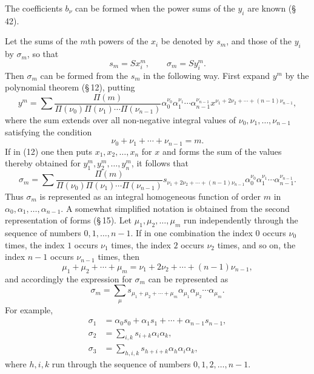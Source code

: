 \documentclass[11pt]{article}
\begin{document}
The coefficients $b_\nu$ can be formed when the power sums of the $y_i$ are known (\S\,42).

Let the sums of the $m$th powers of the $x_i$ be denoted by $s_m$, and those of the $y_i$ by $\sigma_m$, so that
\[
s_m=Sx_i^m,
\qquad
\sigma_m=Sy_i^m.
\]
Then $\sigma_m$ can be formed from the $s_m$ in the following way. First expand $y^m$ by the polynomial theorem (\S\,12), putting
\begin{equation}
y^m=\sum \frac{\Pi(m)}{\Pi(\nu_0)\Pi(\nu_1)\cdots\Pi(\nu_{n-1})}
\alpha_0^{\nu_0}\alpha_1^{\nu_1}\cdots\alpha_{n-1}^{\nu_{n-1}}
 x^{\nu_1+2\nu_2+\cdots+(n-1)\nu_{n-1}},
\tag{12}
\end{equation}
where the sum extends over all non-negative integral values of $\nu_0,\nu_1,
\ldots,\nu_{n-1}$ satisfying the condition
\begin{equation}
\nu_0+\nu_1+\cdots+\nu_{n-1}=m.
\tag{13}
\end{equation}
If in (12) one then puts $x_1,x_2,\ldots,x_n$ for $x$ and forms the sum of the values thereby obtained for $y_1^m,y_2^m,\ldots,y_n^m$, it follows that
\begin{equation}
\sigma_m=\sum \frac{\Pi(m)}{\Pi(\nu_0)\Pi(\nu_1)\cdots\Pi(\nu_{n-1})}
 s_{\nu_1+2\nu_2+\cdots+(n-1)\nu_{n-1}}
 \alpha_0^{\nu_0}\alpha_1^{\nu_1}\cdots\alpha_{n-1}^{\nu_{n-1}}.
\tag{14}
\end{equation}
Thus $\sigma_m$ is represented as an integral homogeneous function of order $m$ in $\alpha_0,\alpha_1,\ldots,\alpha_{n-1}$. A somewhat simplified notation is obtained from the second representation of forms (\S\,15). Let $\mu_1,\mu_2,\ldots,\mu_m$ run independently through the sequence of numbers $0,1,\ldots,n-1$. If in one combination the index $0$ occurs $\nu_0$ times, the index $1$ occurs $\nu_1$ times, the index $2$ occurs $\nu_2$ times, and so on, the index $n-1$ occurs $\nu_{n-1}$ times, then
\[
\mu_1+\mu_2+\cdots+\mu_m=\nu_1+2\nu_2+\cdots+(n-1)\nu_{n-1},
\]
and accordingly the expression for $\sigma_m$ can be represented as
\begin{equation}
\sigma_m=\sum_{\mu} s_{\mu_1+\mu_2+\cdots+\mu_m}\alpha_{\mu_1}\alpha_{\mu_2}\cdots\alpha_{\mu_m}.
\tag{15}
\end{equation}
For example,
\begin{equation}
\begin{aligned}
\sigma_1&=\alpha_0s_0+\alpha_1s_1+\cdots+\alpha_{n-1}s_{n-1},\\
\sigma_2&=\sum_{i,k}s_{i+k}\alpha_i\alpha_k,\\
\sigma_3&=\sum_{h,i,k}s_{h+i+k}\alpha_h\alpha_i\alpha_k,
\end{aligned}
\tag{16}
\end{equation}
where $h,i,k$ run through the sequence of numbers $0,1,2,\ldots,n-1$.
\end{document}
